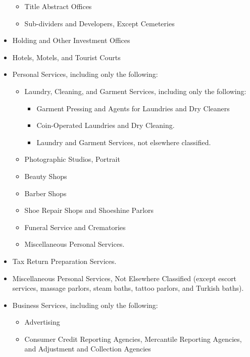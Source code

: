 \begin{itemize}
\begin{itemize}
\item Title Abstract Offices

\item Sub-dividers and Developers, Except Cemeteries
\end{itemize}
\item Holding and Other Investment Offices 

\item Hotels, Motels, and Tourist Courts 

\item Personal Services, including only the following:
\begin{itemize}
\item Laundry, Cleaning, and Garment Services, including only the following:
\begin{itemize}
\item Garment Pressing and Agents for Laundries and Dry Cleaners 

\item Coin-Operated Laundries and Dry Cleaning.

\item Laundry and Garment Services, not elsewhere classified.
\end{itemize}
\item Photographic Studios, Portrait

\item Beauty Shops 

\item Barber Shops 

\item Shoe Repair Shops and Shoeshine Parlors 

\item Funeral Service and Crematories 

\item Miscellaneous Personal Services.
\end{itemize}
\item Tax Return Preparation Services.

\item Miscellaneous Personal Services, Not Elsewhere Classified (except escort
services, massage parlors, steam baths, tattoo parlors, and Turkish baths).

\item Business Services, including only the following:
\begin{itemize}
\item Advertising 

\item Consumer Credit Reporting Agencies, Mercantile Reporting Agencies, and
Adjustment and Collection Agencies 


\end{itemize}
\end{itemize}
